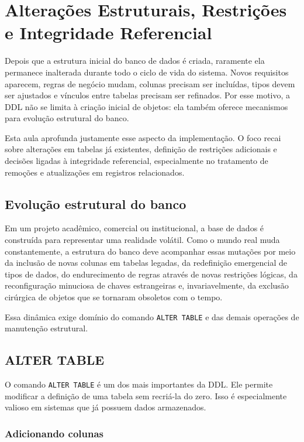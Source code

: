 \chapter{Alterações Estruturais, Restrições e Integridade Referencial}
\label{cap:alteracoes_restricoes_integridade}

Depois que a estrutura inicial do banco de dados é criada, raramente ela permanece inalterada durante todo o ciclo de vida do sistema. Novos requisitos aparecem, regras de negócio mudam, colunas precisam ser incluídas, tipos devem ser ajustados e vínculos entre tabelas precisam ser refinados. Por esse motivo, a DDL não se limita à criação inicial de objetos: ela também oferece mecanismos para evolução estrutural do banco.

Esta aula aprofunda justamente esse aspecto da implementação. O foco recai sobre alterações em tabelas já existentes, definição de restrições adicionais e decisões ligadas à integridade referencial, especialmente no tratamento de remoções e atualizações em registros relacionados.

\section{Evolução estrutural do banco}

Em um projeto acadêmico, comercial ou institucional, a base de dados é construída para representar uma realidade volátil. Como o mundo real muda constantemente, a estrutura do banco deve acompanhar essas mutações por meio da inclusão de novas colunas em tabelas legadas, da redefinição emergencial de tipos de dados, do endurecimento de regras através de novas restrições lógicas, da reconfiguração minuciosa de chaves estrangeiras e, invariavelmente, da exclusão cirúrgica de objetos que se tornaram obsoletos com o tempo.

Essa dinâmica exige domínio do comando \texttt{ALTER TABLE} e das demais operações de manutenção estrutural.

\section{ALTER TABLE}

O comando \texttt{ALTER TABLE} é um dos mais importantes da DDL. Ele permite modificar a definição de uma tabela sem recriá-la do zero. Isso é especialmente valioso em sistemas que já possuem dados armazenados.

\subsection{Adicionando colunas}

